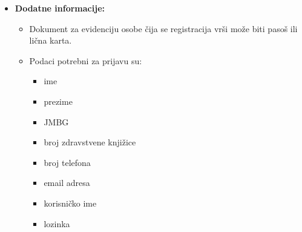\documentclass[titlepage]{article}
\begin{document}
\begin{itemize}
     \item \textbf{Dodatne informacije:}
        \begin{itemize}
	    \item Dokument za evidenciju osobe čija se registracija vrši može biti pasoš ili lična karta.
            \item  Podaci potrebni za prijavu su:
                \begin{itemize}
                    \item ime
                    \item prezime
                    \item JMBG
                    \item broj zdravstvene knjižice
                    \item broj telefona
                    \item email adresa
		    \item korisničko ime
		    \item lozinka
                \end{itemize}
        \end{itemize}
  
\end{itemize}
\end{document}
